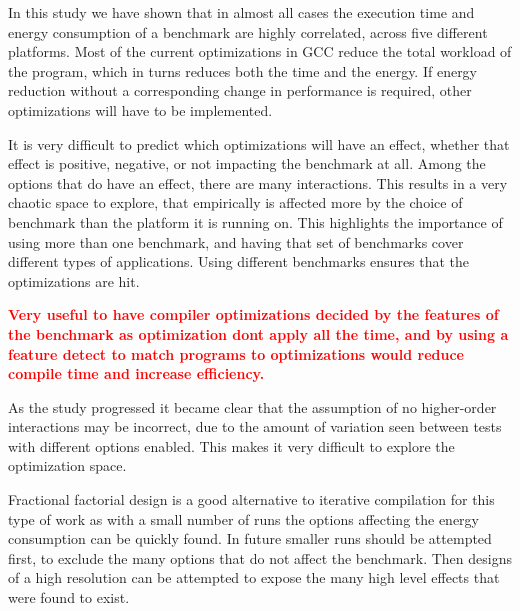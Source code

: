 \documentclass[twocolumn]{article}
\newcommand{\todo}[1]{\textbf{\textcolor{red}{#1}}}
\begin{document}
In this study we have shown that in almost all cases the execution time and energy consumption of a benchmark are highly correlated, across five different platforms. Most of the current optimizations in GCC reduce the total workload of the program, which in turns reduces both the time and the energy. If energy reduction without a corresponding change in performance is required, other optimizations will have to be implemented.

It is very difficult to predict which optimizations will have an effect, whether that effect is positive, negative, or not impacting the benchmark at all. Among the options that do have an effect, there are many interactions. This results in a very chaotic space to explore, that empirically is affected more by the choice of benchmark than the platform it is running on. This highlights the importance of using more than one benchmark, and having that set of benchmarks cover different types of applications. Using different benchmarks ensures that the optimizations are hit.





\todo{Very useful to have compiler optimizations decided by the features of the benchmark as optimization dont apply all the time, and by using a feature detect to match programs to optimizations would reduce compile time and increase efficiency.}

As the study progressed it became clear that the assumption of no higher-order interactions may be incorrect, due to the amount of variation seen between tests with different options enabled. This makes it very difficult to explore the optimization space.

Fractional factorial design is a good alternative to iterative compilation for this type of work as with a small number of runs the options affecting the energy consumption can be quickly found. In future smaller runs should be attempted first, to exclude the many options that do not affect the benchmark. Then designs of a high resolution can be attempted to expose the many high level effects that were found to exist.
\end{document}
